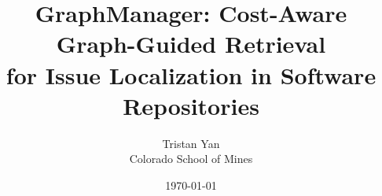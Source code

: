 \documentclass[10pt,twocolumn]{article}
\title{GraphManager: Cost-Aware Graph-Guided Retrieval\\for Issue Localization in Software Repositories}
\author{Tristan Yan\\Colorado School of Mines}
\date{\today}
\begin{document}
\maketitle











\balance



\appendix

\end{document}
